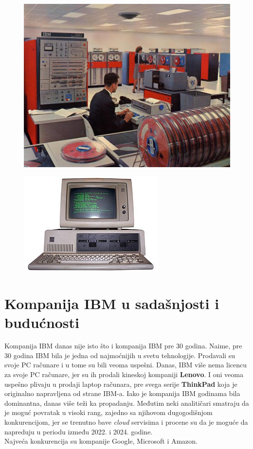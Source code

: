 \documentclass[a4paper]{article}
\begin{document}
\begin{figure}[!hb]
\centering
\begin{minipage}{.5\textwidth}
  \centering
  \includegraphics[width=.6\linewidth]{sys360.jpg}
  \label{fig:S360}
\end{minipage}%
\begin{minipage}{.5\textwidth}
  \centering
  \includegraphics[width=.6\linewidth]{ibmpc.jpg}
  \label{fig:IBMPC}
\end{minipage}
\end{figure}

\section{Kompanija IBM u sadašnjosti i budućnosti}
Kompanija IBM danas nije isto što i kompanija IBM pre 30 godina. Naime, pre 30 godina IBM bila je jedna od najmoćnijih u svetu tehnologije. Prodavali su svoje PC računare i u tome su bili veoma uspešni.
Danas, IBM više nema licencu za svoje PC računare, jer su ih prodali kineskoj kompaniji \textbf{Lenovo}\cite{lit1}. I oni veoma uspešno plivaju u prodaji laptop računara, pre svega serije \textbf{ThinkPad} koja je originalno napravljena od strane IBM-a. Iako je kompanija IBM godinama bila dominantna, danas više teži ka propadanju. Međutim neki analitičari smatraju da je moguć povratak u visoki rang, zajedno sa njihovom dugogodišnjom konkurencijom, jer se trenutno bave \emph{cloud} servisima i procene su da je moguće da napreduju u periodu između 2022. i 2024. godine.\\
Najveća konkurencija su kompanije Google, Microsoft i Amazon.
\\
\end{document}
